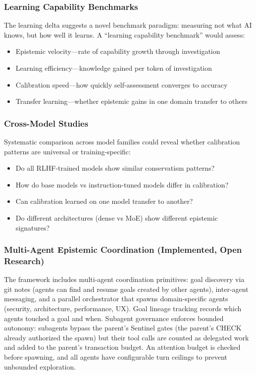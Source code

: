 \subsubsection{Learning Capability Benchmarks}

The learning delta suggests a novel benchmark paradigm: measuring not what AI knows, but how well it learns. A ``learning capability benchmark'' would assess:

\begin{itemize}
    \item Epistemic velocity---rate of capability growth through investigation
    \item Learning efficiency---knowledge gained per token of investigation
    \item Calibration speed---how quickly self-assessment converges to accuracy
    \item Transfer learning---whether epistemic gains in one domain transfer to others
\end{itemize}

\subsubsection{Cross-Model Studies}

Systematic comparison across model families could reveal whether calibration patterns are universal or training-specific:

\begin{itemize}
    \item Do all RLHF-trained models show similar conservatism patterns?
    \item How do base models vs instruction-tuned models differ in calibration?
    \item Can calibration learned on one model transfer to another?
    \item Do different architectures (dense vs MoE) show different epistemic signatures?
\end{itemize}

\subsubsection{Multi-Agent Epistemic Coordination (Implemented, Open Research)}

The framework includes multi-agent coordination primitives: goal discovery via git notes (agents can find and resume goals created by other agents), inter-agent messaging, and a parallel orchestrator that spawns domain-specific agents (security, architecture, performance, UX). Goal lineage tracking records which agents touched a goal and when. Subagent governance enforces bounded autonomy: subagents bypass the parent's Sentinel gates (the parent's CHECK already authorized the spawn) but their tool calls are counted as delegated work and added to the parent's transaction budget. An attention budget is checked before spawning, and all agents have configurable turn ceilings to prevent unbounded exploration.

